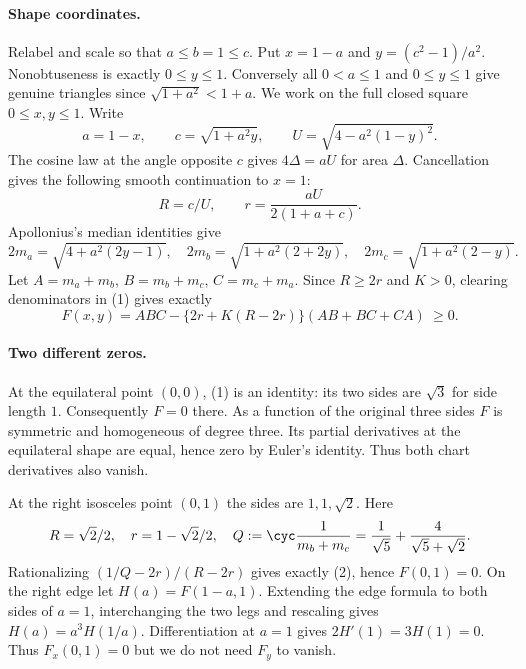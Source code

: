\documentclass[11pt,a4paper]{article}
\numberwithin{equation}{section}
\theoremstyle{definition}
\theoremstyle{remark}
\begin{document}
\paragraph{Shape coordinates.}
Relabel and scale so that $a\le b=1\le c$. Put $x=1-a$ and $y=(c^2-1)/a^2$. Nonobtuseness is exactly $0\le y\le1$. Conversely all $0<a\le1$ and $0\le y\le1$ give genuine triangles since $\sqrt{1+a^2}<1+a$. We work on the full closed square $0\le x,y\le1$. Write
\[
 a=1-x,\qquad c=\sqrt{1+a^2y},\qquad
 U=\sqrt{4-a^2(1-y)^2}.
\]
The cosine law at the angle opposite $c$ gives $4\Delta=aU$ for area $\Delta$. Cancellation gives the following smooth continuation to $x=1$:
\[
 R=c/U,\qquad r=\frac{aU}{2(1+a+c)}.
\]
Apollonius's median identities give
\[
 2m_a=\sqrt{4+a^2(2y-1)},\quad
 2m_b=\sqrt{1+a^2(2+2y)},\quad
 2m_c=\sqrt{1+a^2(2-y)}.
\]
Let $A=m_a+m_b$, $B=m_b+m_c$, $C=m_c+m_a$. Since $R\ge 2r$ and $K>0$, clearing denominators in (1) gives exactly
\[
 F(x,y)=ABC-\{2r+K(R-2r)\}(AB+BC+CA)\ \ge 0. \tag{3}
\]

\paragraph{Two different zeros.}
At the equilateral point $(0,0)$, (1) is an identity: its two sides are $\sqrt{3}$ for side length $1$. Consequently $F=0$ there. As a function of the original three sides $F$ is symmetric and homogeneous of degree three. Its partial derivatives at the equilateral shape are equal, hence zero by Euler's identity. Thus both chart derivatives also vanish.

At the right isosceles point $(0,1)$ the sides are $1,1,\sqrt2$. Here
\[
 R=\sqrt2/2,\quad r=1-\sqrt2/2,\quad
 Q:=\cyc\frac1{m_b+m_c}=\frac1{\sqrt5}+\frac4{\sqrt5+\sqrt2}.
\]
Rationalizing $(1/Q-2r)/(R-2r)$ gives exactly (2), hence $F(0,1)=0$. On the right edge let $H(a)=F(1-a,1)$. Extending the edge formula to both sides of $a=1$, interchanging the two legs and rescaling gives $H(a)=a^3 H(1/a)$. Differentiation at $a=1$ gives $2H'(1)=3H(1)=0$. Thus $F_x(0,1)=0$ but we do not need $F_y$ to vanish.
\end{document}
